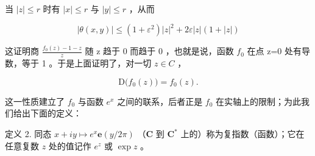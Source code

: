 当 \(|z| \leqslant r\) 时有 \(|x| \leqslant r\) 与 \(|y| \leqslant r\) ，从而

\[
\left| \theta (x, y) \right| \leqslant \left(1 + \varepsilon^ {2}\right) | z | ^ {2} + 2 \varepsilon | z | (1 + | z |)
\]

这证明商 \(\frac{f_{0}(z)-1-z}{z}\) 随 z 趋于 0 而趋于 0 ，也就是说，函数 \(f_{0}\) 在点 z=0 处有导数，等于 1 。于是上面证明了，对一切 \(z\in C\) ，

\[
\mathrm{D} \big (f _ {0} (z) \big) = f _ {0} (z).\tag{21}
\]

这一性质建立了 \(f_{0}\) 与函数 \(e^{x}\) 之间的联系，后者正是 \(f_{0}\) 在实轴上的限制；为此我们给出下面的定义：

定义 2. 同态 \(x + iy \mapsto e^x\mathbf{e}(y/2\pi)\) （\(\mathbf{C}\) 到 \(\mathbf{C}^*\) 上的）称为复指数（函数）；它在任意复数 \(z\) 处的值记作 \(e^z\) 或 \(\exp z\) 。

